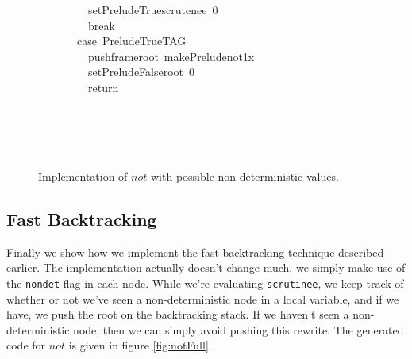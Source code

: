 \documentclass{book}
\theoremstyle{definition}
\newcommand{\Varid}[1]{\mathit{#1}}
\begin{document}
\begin{figure}
\begin{tabbing}
\ttfamily ~~~~~~~~~setPreludeTruescrutenee~0\\
\ttfamily ~~~~~~~~~break\\
\ttfamily ~~~~~~~case~PreludeTrueTAG\\
\ttfamily ~~~~~~~~~pushframeroot~makePreludenot1x\\
\ttfamily ~~~~~~~~~setPreludeFalseroot~0\\
\ttfamily ~~~~~~~~~return\\
\ttfamily ~~~~~~~\\
\ttfamily ~~~~~\\
\ttfamily ~~~\\
\ttfamily ~
\end{tabbing}
\caption{Implementation of \ensuremath{\Varid{not}} with possible non-deterministic values.}
\label{fig:notNondet}
\end{figure}


\subsection{Fast Backtracking} \label{Fast Backtracking}

Finally we show how we implement the fast backtracking technique described earlier.
The implementation actually doesn't change much,
we simply make use of the \texttt{nondet} flag in each node.
While we're evaluating \texttt{scrutinee},
we keep track of whether or not we've seen
a non-deterministic node in a local variable, and if we have, we push
the root on the backtracking stack.
If we haven't seen a non-deterministic node,
then we can simply avoid pushing this rewrite.
The generated code for \ensuremath{\Varid{not}} is given in figure \ref{fig:notFull}.
\end{document}
